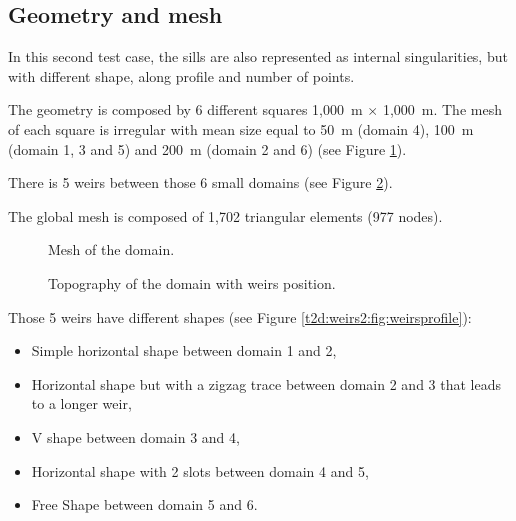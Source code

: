 \subsection{Geometry and mesh}

In this second test case, the sills are also represented as internal
singularities, but with different shape, along profile and number of points.

The geometry is composed by 6 different squares 1,000~m $\times$ 1,000~m.
The mesh of each square is irregular with mean size equal to 50~m (domain 4), 
100~m (domain 1, 3 and 5) and 200~m (domain 2 and 6) (see Figure \ref{t2d:weirs2:fig:mesh}).

There is 5 weirs between those 6 small domains
(see Figure \ref{t2d:weirs2:fig:geo}).

The global mesh is composed of 1,702 triangular elements (977 nodes).

\begin{figure}[H]
 \centering
 \caption{Mesh of the domain.}
 \label{t2d:weirs2:fig:mesh}
\end{figure}

\begin{figure}[H]
 \centering
 \caption{Topography of the domain with weirs position.}
 \label{t2d:weirs2:fig:geo}
\end{figure}

Those 5 weirs have different shapes (see Figure \ref{t2d:weirs2:fig:weirsprofile}):
\begin{itemize}
\item Simple horizontal shape between domain 1 and 2, %
\item Horizontal shape but with a zigzag trace between domain 2 and 3 
that leads to a longer weir, %
\item V shape between domain 3 and 4, %
\item Horizontal shape with 2 slots between domain 4 and 5, %
\item Free Shape between domain 5 and 6. %
\end{itemize}

